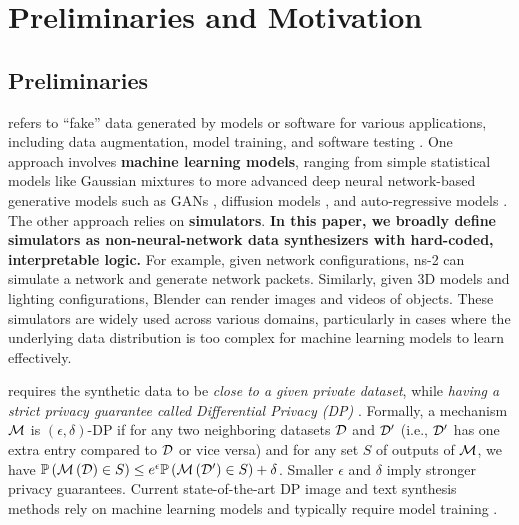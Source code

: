 \section{Preliminaries and Motivation}

\subsection{Preliminaries}
\label{sec:preliminaries}

 refers to ``fake'' data generated by models or software for various applications, including data augmentation, model training, and software testing \cite{lin2022data}. One approach involves \textbf{machine learning models}, ranging from simple statistical models like Gaussian mixtures to more advanced deep neural network-based generative models such as GANs \cite{goodfellow2020generative}, diffusion models \cite{sohl2015deep}, and auto-regressive models \cite{openai2023gpt4,liu2024distilled}.
The other approach relies on \textbf{simulators}. \textbf{In this paper, we broadly define simulators as non-neural-network data synthesizers with hard-coded, interpretable logic.} For example, given network configurations, ns-2 \cite{issariyakul2009introduction} can simulate a network and generate network packets. Similarly, given 3D models and lighting configurations, Blender \cite{blender} can render images and videos of objects.
These simulators are widely used across various domains, particularly in cases where the underlying data distribution is too complex for machine learning models to learn effectively.

 requires the synthetic data to be \emph{close to a given private dataset}, while \emph{having a strict privacy guarantee called Differential Privacy (DP)} \cite{dwork2006calibrating}. Formally, a mechanism $\mathcal{M}$ is $(\epsilon,\delta)$-DP if for any two neighboring datasets $\mathcal{D}$ and $\mathcal{D}'$ (i.e., $\mathcal{D}'$ has one extra entry compared to $\mathcal{D}$ or vice versa) and for any set $S$ of outputs of $\mathcal{M}$, we have 
$\mathbb{P}\left( \mathcal{M}\left( \mathcal{D} \right)\in S \right)\leq e^{\epsilon}\mathbb{P}\left( \mathcal{M}\left( \mathcal{D}' \right)\in S \right) + \delta$. 
Smaller $\epsilon$ and $\delta$ imply stronger privacy guarantees. 
Current state-of-the-art DP image and text synthesis methods rely on machine learning models and typically require model training \cite{lin2020using,beaulieu2019privacy,dockhorn2022differentially,yin2022practical,yu2021differentially,he2022exploring,li2021large,ghalebikesabi2023differentially,yue2022synthetic,jordon2019pate,harder2022differentially,harder2021dp,vinaroz2022hermite,cao2021don}.

